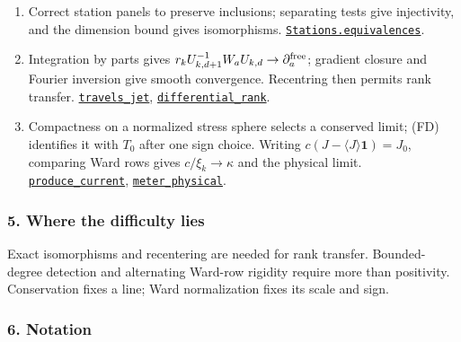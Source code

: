 \documentclass[
  letterpaper,
  11pt]{article}
\begin{document}
\begin{enumerate}
  \href{https://github.com/yang-mills-group/OpenAI-YM-20261028/blob/3456e5e75cf8d4cd558955a5c7638fba2d68f464/YM/Next/UV_STRESS/Station.lean\#L132-L180}{\texttt{harvested}}.
\item
  Correct station panels to preserve inclusions; separating tests give
  injectivity, and the dimension bound gives isomorphisms.
  \href{https://github.com/yang-mills-group/OpenAI-YM-20261028/blob/3456e5e75cf8d4cd558955a5c7638fba2d68f464/YM/Next/UV_STRESS/Invert.lean\#L132-L181}{\texttt{Stations.equivalences}}.
\item
  Integration by parts gives
  \(r_kU_{k,d+1}^{-1}W_aU_{k,d}\to\partial_a^{\rm free}\); gradient
  closure and Fourier inversion give smooth convergence. Recentring then
  permits rank transfer.
  \href{https://github.com/yang-mills-group/OpenAI-YM-20261028/blob/3456e5e75cf8d4cd558955a5c7638fba2d68f464/YM/Next/UV_STRESS/Focus.lean\#L183-L196}{\texttt{travels\_jet}},
  \href{https://github.com/yang-mills-group/OpenAI-YM-20261028/blob/3456e5e75cf8d4cd558955a5c7638fba2d68f464/YM/Next/UV_STRESS/Dimension.lean\#L165-L195}{\texttt{differential\_rank}}.
\item
  Compactness on a normalized stress sphere selects a conserved limit;
  (FD) identifies it with \(T_0\) after one sign choice. Writing
  \(c(J-\langle J\rangle\mathbf1)=J_0\), comparing Ward rows gives
  \(c/\xi_k\to\kappa\) and the physical limit.
  \href{https://github.com/yang-mills-group/OpenAI-YM-20261028/blob/3456e5e75cf8d4cd558955a5c7638fba2d68f464/YM/Next/UV_STRESS/Limit.lean\#L129-L167}{\texttt{produce\_current}},
  \href{https://github.com/yang-mills-group/OpenAI-YM-20261028/blob/3456e5e75cf8d4cd558955a5c7638fba2d68f464/YM/Pert/Weak.lean\#L118-L144}{\texttt{meter\_physical}}.
\end{enumerate}

\subsubsection{5. Where the difficulty
lies}\label{where-the-difficulty-lies-24}

Exact isomorphisms and recentering are needed for rank transfer.
Bounded-degree detection and alternating Ward-row rigidity require more
than positivity. Conservation fixes a line; Ward normalization fixes its
scale and sign.

\subsubsection{6. Notation}\label{notation-24}
\end{document}
